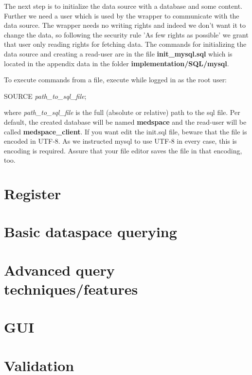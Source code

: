 The next step is to initialize the data source with a database and some content. Further we need a user which is used by the wrapper to communicate with the data source. The wrapper needs no writing rights and indeed we don't want it to change the data, so following the security rule 'As few rights as possible' we grant that user only reading rights for fetching data. The commands for initializing the data source and creating a read-user are in the file \textbf{init\_mysql.sql} which is located in the appendix data in the folder \textbf{implementation/SQL/mysql}.

To execute commands from a file, execute while logged in as the root user:

\begin{codebox}
	SOURCE \emph{path\_to\_sql\_file};
\end{codebox}

where \emph{path\_to\_sql\_file} is the full (absolute or relative) path to the sql file.
Per default, the created database will be named \textbf{medspace} and the read-user will be called \textbf{medspace\_client}. If you want edit the init.sql file, beware that the file is encoded in UTF-8. As we instructed mysql to use UTF-8 in every case, this is encoding is required. Assure that your file editor saves the file in that encoding, too.




\section{Register}

\section{Basic dataspace querying}
\section{Advanced query techniques/features}
\section{GUI}
\section{Validation}